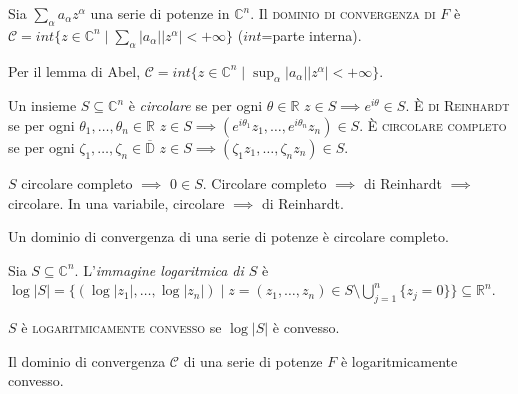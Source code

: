 \begin{defn}
  Sia $\displaystyle \sum_{\alpha} a_{\alpha}z^{\alpha}$ una serie di potenze in $\mathbb{C}^n$. Il \textsc{dominio di convergenza di $F$} è $\displaystyle \mathcal{C}=int\{z \in \mathbb{C}^n \mid \sum_{\alpha} |a_{\alpha}||z^{\alpha}|<+\infty\}$ ($int$=parte interna).
\end{defn}

\begin{oss}
  Per il lemma di Abel, $\displaystyle \mathcal{C}=int\{z \in \mathbb{C}^n \mid \sup_{\alpha} |a_{\alpha}||z^{\alpha}|<+\infty\}$.
\end{oss}

\begin{defn}
  Un insieme $S \subseteq \mathbb{C}^n$ è \textit{circolare} se per ogni $\theta \in \mathbb{R}$ $z \in S \implies e^{i\theta} \in S$.
  È \textsc{di Reinhardt} se per ogni $\theta_1, \dots, \theta_n \in \mathbb{R}$ $z \in S \implies (e^{i\theta_1}z_1, \dots, e^{i\theta_n}z_n) \in S$.
  È \textsc{circolare completo} se per ogni $\zeta_1, \dots, \zeta_n \in \overline{\mathbb{D}}$ $z \in S \implies (\zeta_1z_1,\dots,\zeta_nz_n) \in S$.
\end{defn}

\begin{oss}
  $S$ circolare completo $\implies$ $0 \in S$. Circolare completo $\implies$ di Reinhardt $\implies$ circolare. In una variabile, circolare $\implies$ di Reinhardt.
\end{oss}

\begin{oss}
  Un dominio di convergenza di una serie di potenze è circolare completo.
\end{oss}

\begin{defn}
  Sia $S \subseteq \mathbb{C}^n$. L'\textit{immagine logaritmica di $S$} è $\displaystyle \log{|S|}=\{(\log{|z_1|}, \dots, \log{|z_n|}) \mid z=(z_1, \dots, z_n) \in S \setminus \bigcup_{j=1}^n \{z_j=0\} \} \subseteq \mathbb{R}^n$.
\end{defn}

\begin{defn}
  $S$ è \textsc{logaritmicamente convesso} se $\log{|S|}$ è convesso.
\end{defn}

\begin{prop}
  Il dominio di convergenza $\mathcal{C}$ di una serie di potenze $F$ è logaritmicamente convesso.
\end{prop}

